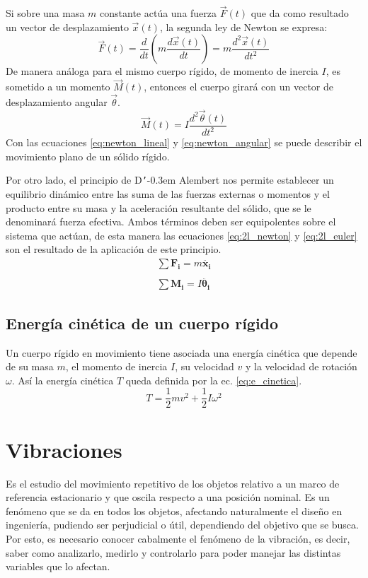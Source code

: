 Si sobre una masa $m$ constante actúa una fuerza $\vec{F}(t)$ que da como resultado un vector de desplazamiento $\vec{x}(t)$, la segunda ley de Newton se expresa:
\begin{equation}\label{eq:newton_lineal}
	\vec{F}(t) = \frac{d}{dt}\left(m\frac{d\vec{x}(t)}{dt}\right) = m \frac{d^2\vec{x}(t)}{dt^2}
\end{equation}
De manera análoga para el mismo cuerpo rígido, de momento de inercia $I$, es sometido a un momento $\vec{M}(t)$, entonces el cuerpo girará con un vector de desplazamiento angular $\vec{\theta}$.
\begin{equation}\label{eq:newton_angular}
	\vec{M}(t) = I\frac{d^2\vec{\theta}(t)}{dt^2}
\end{equation} 
Con las ecuaciones \ref{eq:newton_lineal} y \ref{eq:newton_angular} se puede describir el movimiento plano de un sólido rígido.

Por otro lado, el principio de D\texttt{'}\kern-0.3em Alembert nos permite establecer un equilibrio dinámico entre las suma de las fuerzas externas o momentos y el producto entre su masa y la aceleración resultante del sólido, que se le denominará fuerza efectiva. Ambos términos deben ser equipolentes sobre el sistema que actúan, de esta manera las ecuaciones \ref{eq:2l_newton} y \ref{eq:2l_euler} son el resultado de la aplicación de este principio.
\begin{gather}
	\sum \mathbf{F_i} = m\mathbf{\ddot{x_i}} \label{eq:2l_newton}\\
	\nonumber \\
	\sum \mathbf{M_i} = I\mathbf{\ddot{\theta_i}} \label{eq:2l_euler}
\end{gather}

\subsection{Energía cinética de un cuerpo rígido}
Un cuerpo rígido en movimiento tiene asociada una energía cinética que depende de su masa $m$, el momento de inercia $I$, su velocidad $v$ y la velocidad de rotación $\omega$. Así la energía cinética $T$ queda definida por la ec. \ref{eq:e_cinetica}.
\begin{equation}\label{eq:e_cinetica}
	T = \frac{1}{2}mv^2 + \frac{1}{2}I\omega^2 
\end{equation}


\section{Vibraciones}
Es el estudio del movimiento repetitivo de los objetos relativo a un marco de referencia estacionario y que oscila respecto a una posición nominal. Es un fenómeno que se da en todos los objetos, afectando naturalmente el diseño en ingeniería, pudiendo ser perjudicial o útil, dependiendo del objetivo que se busca. Por esto, es necesario conocer cabalmente el fenómeno de la vibración, es decir, saber como analizarlo, medirlo y controlarlo para poder manejar las distintas variables que lo afectan.

